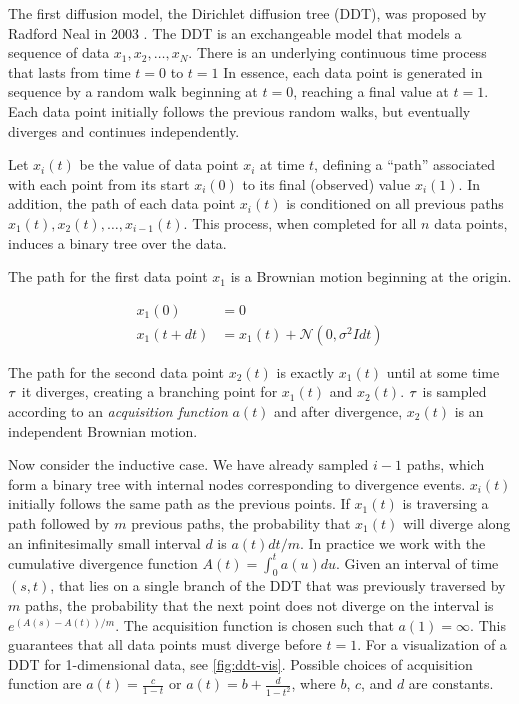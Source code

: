 The first diffusion model, the Dirichlet diffusion tree (DDT),
was proposed by Radford Neal in 2003 \citep{Neal2003}.
The DDT is an exchangeable model that models a sequence of data
$x_1, x_2,\ldots,x_N$.
There is an underlying continuous time process
that lasts from time $t = 0$ to $t = 1$
In essence, each data point is generated in sequence by
a random walk beginning at $t = 0$,
reaching a final value at $t = 1$.
Each data point initially follows the previous
random walks, but eventually diverges and continues independently.

Let $x_i(t)$ be the value of data point $x_i$
at time $t$, defining a ``path'' associated
with each point from its start $x_i(0)$ to its final (observed) value $x_i(1)$.
In addition, the path of each data point $x_i(t)$ is conditioned
on all previous paths $x_1(t), x_2(t), \ldots, x_{i -1 }(t)$.
This process, when completed for all $n$ data points,
induces a binary tree over the data.

The path for the first data point $x_1$
is a Brownian motion
beginning at the origin.

\begin{align}
  x_1(0) &= 0 \\
  x_1(t + dt) &= x_1(t) + \mathcal{N}(0, \sigma^2Idt)
\end{align}

The path for the second data point $x_2(t)$
is exactly $x_1(t)$ until
at some time $\tau$ it diverges,
creating a branching point for
$x_1(t)$ and $x_2(t)$.
$\tau$ is sampled according to an \emph{acquisition function}
$a(t)$ and
after divergence, $x_2(t)$ is an
independent Brownian motion.

Now consider the inductive case.
We have already sampled $i - 1$
paths, which form a binary tree
with internal nodes corresponding to
divergence events.
$x_i(t)$ initially follows the same
path as the previous points.
If $x_1(t)$ is traversing a path
followed by $m$ previous paths,
the probability that $x_1(t)$ will
diverge along an infinitesimally small
interval $d$ is 
$a(t)dt/m$. 
In practice we work with the cumulative
divergence function $A(t) = \int_0^t a(u)du$.
Given an interval of time $(s, t)$,
that lies on a single branch of the DDT
that was previously traversed by $m$ paths,
the probability that the next point
does not diverge on the interval
is $e^{(A(s) - A(t))/m}$.
The acquisition function is chosen such that
$a(1) = \infty$. This guarantees that
all data points must diverge 
before $t = 1$. 
For a visualization of a DDT
for 1-dimensional data, see \autoref{fig:ddt-vis}.
Possible choices of acquisition function
are $a(t) = \frac{c}{1 - t}$ or $a(t) = b + \frac{d}{1 - t^2}$,
where $b$, $c$, and $d$ are constants.

